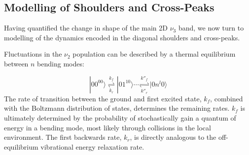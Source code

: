 {\subsection{Modelling of Shoulders and Cross-Peaks}
\label{sec:shoulders_modeling}
Having quantified the change in shape of the main 2D \(\nu_3\) band, we now turn to modelling of the dynamics encoded in the diagonal shoulders and cross-peaks.

Fluctuations in the  \(\nu_2\) population can be described by a thermal equilibrium between \(n\) bending modes:

\begin{equation}
  \label{eq:kinetic}
  |00^00 \rangle \overset{k_{f}}{\underset{k_{r}}\rightleftharpoons} |01^10 \rangle \cdots \overset{k''_{f}}{\underset{k''_{r}}\rightleftharpoons} |0n^l0 \rangle
\end{equation}
The rate of transition between the ground and first excited state, \(k_f\), combined with the Boltzmann distribution of states, determines the remaining rates. \(k_f\) is ultimately determined by the probability of stochastically gain a quantum of energy in a  bending mode, most likely through collisions in the local environment. The first backwards rate, $k_r$, is directly analogous to the off-equilibrium vibrational energy relaxation rate.

}

